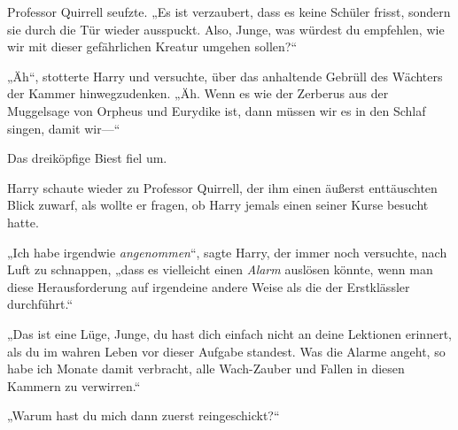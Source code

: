 Professor Quirrell seufzte.
„Es ist verzaubert, dass es keine Schüler frisst, sondern sie durch die Tür wieder ausspuckt. Also, Junge, was würdest du empfehlen, wie wir mit dieser gefährlichen Kreatur umgehen sollen?“

„Äh“, stotterte Harry und versuchte, über das anhaltende Gebrüll des Wächters der Kammer hinwegzudenken. „Äh. Wenn es wie der Zerberus aus der Muggelsage von Orpheus und Eurydike ist, dann müssen wir es in den Schlaf singen, damit wir—“


Das dreiköpfige Biest fiel um.

Harry schaute wieder zu Professor Quirrell, der ihm einen äußerst enttäuschten Blick zuwarf, als wollte er fragen, ob Harry jemals einen seiner Kurse besucht hatte.

„Ich habe irgendwie \emph{angenommen}“, sagte Harry, der immer noch versuchte, nach Luft zu schnappen, „dass es vielleicht einen \emph{Alarm} auslösen könnte, wenn man diese Herausforderung auf irgendeine andere Weise als die der Erstklässler durchführt.“

„Das ist eine Lüge, Junge, du hast dich einfach nicht an deine Lektionen erinnert, als du im wahren Leben vor dieser Aufgabe standest. Was die Alarme angeht, so habe ich Monate damit verbracht, alle Wach-Zauber und Fallen in diesen Kammern zu verwirren.“

„Warum hast du mich dann zuerst reingeschickt?“

